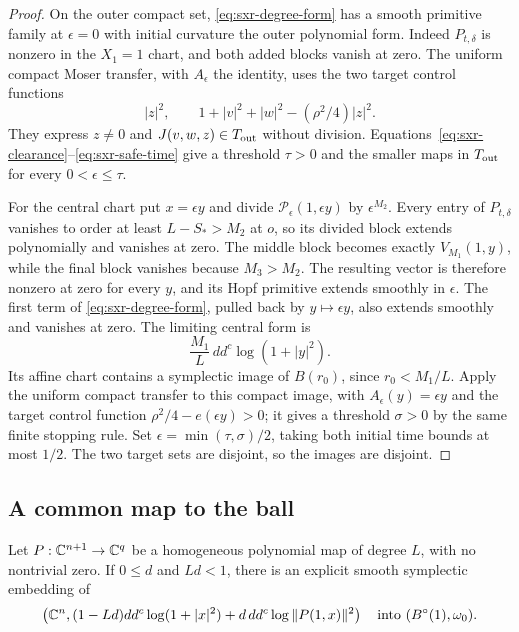 \begin{proof}
On the outer compact set, \eqref{eq:sxr-degree-form} has a smooth primitive family
at $\epsilon=0$ with initial curvature the outer polynomial form.
Indeed $P_{t,\delta}$ is nonzero in the $X_1=1$ chart, and both added blocks vanish
at zero. The uniform compact Moser transfer, with $A_\epsilon$ the identity,
uses the two target control functions
\[
 |z|^2,\qquad 1+|v|^2+|w|^2-(\rho^2/4)|z|^2.
\]
They express $z\ne0$ and $J(v,w,z)\in T_{\rm out}$ without division.
Equations~\eqref{eq:sxr-clearance}--\eqref{eq:sxr-safe-time} give a threshold
$\tau>0$ and the smaller maps in $T_{\rm out}$ for every $0<\epsilon\le\tau$.

For the central chart put $x=\epsilon y$ and divide
$\mathcal P_\epsilon(1,\epsilon y)$ by $\epsilon^{M_2}$.
Every entry of $P_{t,\delta}$ vanishes to order at least $L-S_*>M_2$ at $o$,
so its divided block extends polynomially and vanishes at zero.
The middle block becomes exactly $V_{M_1}(1,y)$, while the final block vanishes
because $M_3>M_2$. The resulting vector is therefore nonzero at zero for every
$y$, and its Hopf primitive extends smoothly in $\epsilon$.
The first term of \eqref{eq:sxr-degree-form}, pulled back by $y\mapsto\epsilon y$,
also extends smoothly and vanishes at zero.
The limiting central form is
\[
 \frac{M_1}L\,dd^c\log(1+|y|^2).
\]
Its affine chart contains a symplectic image of $B(r_0)$, since $r_0<M_1/L$.
Apply the uniform compact transfer to this compact image, with
$A_\epsilon(y)=\epsilon y$ and the target control function
$\rho^2/4-e(\epsilon y)>0$; it gives a threshold $\sigma>0$ by the same finite
stopping rule. Set $\epsilon=\min(\tau,\sigma)/2$, taking both initial time bounds
at most $1/2$. The two target sets are disjoint, so the images are disjoint.
\end{proof}

\subsection{A common map to the ball}\label{sec:sxr-shell}

\begin{lemma}\label{lem:sxr-shell}
Let $P:\mathbb{C}^{n+1}\to\mathbb{C}^q$ be a homogeneous polynomial map of degree $L$, with no
nontrivial zero. If $0\le d$ and $Ld<1$, there is an explicit smooth symplectic
embedding of
\[
 \left(\mathbb{C}^n,(1-Ld)dd^c\log(1+|x|^2)+d\,dd^c\log\|P(1,x)\|^2\right)
 \quad\hbox{into }(B^{\circ}(1),\omega_0).
\]
\end{lemma}

